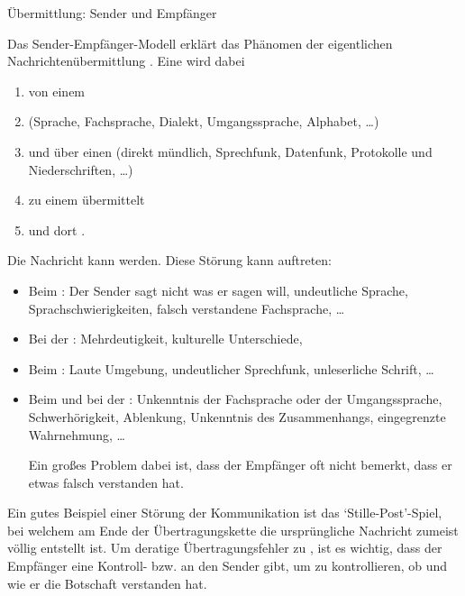 \Text
{Übermittlung: Sender und Empfänger}
{%
Das Sender-Empfänger-Modell erklärt das Phänomen der 
eigentlichen Nachrichtenübermittlung \cite{Informatik3}.
Eine  wird dabei 
\begin{enumerate}
  \item von
  einem 
  \item {} (Sprache, Fachsprache, Dialekt,
  Umgangssprache, Alphabet, \ldots)
  \item und über einen  (direkt mündlich,
  Sprechfunk, Datenfunk, Protokolle und Niederschriften, \ldots)
  \item zu einem  übermittelt
  \item und dort .
\end{enumerate}
Die Nachricht kann  werden.
Diese Störung kann auftreten:
\begin{itemize}
  \item Beim : Der Sender sagt nicht was er sagen
  will, undeutliche Sprache, Sprachschwierigkeiten, 
  falsch verstandene Fachsprache, \ldots
  \item Bei der : Mehrdeutigkeit, kulturelle
  Unterschiede,
  \item Beim : Laute Umgebung,
  undeutlicher Sprechfunk, unleserliche Schrift, \ldots
  \item Beim  und bei der :
  Unkenntnis der Fachsprache oder der Umgangssprache, Schwerhörigkeit, Ablenkung, Unkenntnis
  des Zusammenhangs, eingegrenzte Wahrnehmung, \ldots
  
  Ein großes Problem dabei ist, dass der Empfänger oft
  nicht bemerkt, dass er etwas falsch verstanden hat.
\end{itemize}

\begin{Synopsis}
\end{Synopsis}

Ein gutes Beispiel einer Störung der Kommunikation ist das
\enquote*{Stille-Post}-Spiel, bei welchem am Ende der
Übertragungskette die ursprüngliche Nachricht zumeist völlig
entstellt ist. Um deratige Übertragungsfehler zu
, ist es wichtig, dass der Empfänger eine
Kontroll- bzw.  an den Sender gibt, um zu
kontrollieren, ob und wie er die Botschaft verstanden hat.

}
{}
{}
{}
{}



